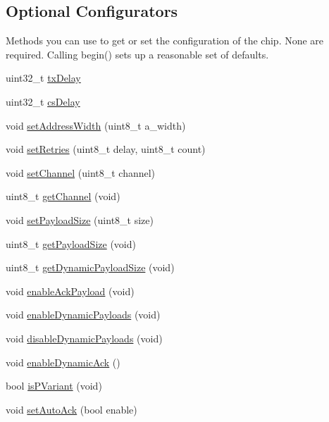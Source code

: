 \subsection*{Optional Configurators}
\label{_amgrpe1a83b99ec8153e5baf680edeeed1586}%
 Methods you can use to get or set the configuration of the chip. None are required. Calling begin() sets up a reasonable set of defaults. \begin{DoxyCompactItemize}
\item 
uint32\+\_\+t \hyperlink{classNRF24L01_a1feaab910ecff17805f8141fe40028e7}{tx\+Delay}
\item 
uint32\+\_\+t \hyperlink{classNRF24L01_abae8b8afbf747344006d6163c607be00}{cs\+Delay}
\item 
void \hyperlink{classNRF24L01_a17752733515f67aa9f6ed3daa1ed3d1d}{set\+Address\+Width} (uint8\+\_\+t a\+\_\+width)
\item 
void \hyperlink{classNRF24L01_a0bb209d94b62e2a28af53179af713f3c}{set\+Retries} (uint8\+\_\+t delay, uint8\+\_\+t count)
\item 
void \hyperlink{classNRF24L01_aa8eaf9d5ed604f60a00cd79fed9edad7}{set\+Channel} (uint8\+\_\+t channel)
\item 
uint8\+\_\+t \hyperlink{classNRF24L01_a6b269b519d57d54d0682a29ce9036b12}{get\+Channel} (void)
\item 
void \hyperlink{classNRF24L01_abe5983a57d0d3bd77508e5345774c890}{set\+Payload\+Size} (uint8\+\_\+t size)
\item 
uint8\+\_\+t \hyperlink{classNRF24L01_a4a7f48ca92e14baabd8be1c0831e8c2f}{get\+Payload\+Size} (void)
\item 
uint8\+\_\+t \hyperlink{classNRF24L01_a0d0cd5dd09d60e06280f378166725d64}{get\+Dynamic\+Payload\+Size} (void)
\item 
void \hyperlink{classNRF24L01_ae4067455572c6731211315b3900f5cbd}{enable\+Ack\+Payload} (void)
\item 
void \hyperlink{classNRF24L01_abd060c4df7efac781ed5812a0ee19d08}{enable\+Dynamic\+Payloads} (void)
\item 
void \hyperlink{classNRF24L01_abf6bf0c18b2b12674cfbc150a2bdb778}{disable\+Dynamic\+Payloads} (void)
\item 
void \hyperlink{classNRF24L01_aeaa968ea74bfd2690fff331e9f115344}{enable\+Dynamic\+Ack} ()
\item 
bool \hyperlink{classNRF24L01_ad05024c9586c1dc76c2fd95d54ce6b4c}{is\+P\+Variant} (void)
\item 
void \hyperlink{classNRF24L01_a33b1c7dd1cad95dae57ef87bf3dce5c8}{set\+Auto\+Ack} (bool enable)

\end{DoxyCompactItemize}

